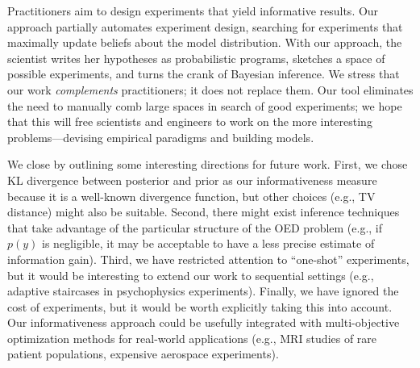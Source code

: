 \documentclass{article}
\begin{document}
Practitioners aim to design experiments that yield informative results.
Our approach partially automates experiment design, searching for experiments that maximally update beliefs about the model distribution.
With our approach, the scientist writes her hypotheses as probabilistic programs, sketches a space of possible experiments, and turns the crank of Bayesian inference.
We stress that our work \emph{complements} practitioners; it does not replace them.
Our tool eliminates the need to manually comb large spaces in search of good experiments; we hope that this will free scientists and engineers to work on the more interesting problems---devising empirical paradigms and building models.

We close by outlining some interesting directions for future work.
First, we chose KL divergence between posterior and prior as our informativeness measure because it is a well-known divergence function, but other choices (e.g., TV distance) might also be suitable.
Second, there might exist inference techniques that take advantage of the particular structure of the OED problem (e.g., if $p(y)$ is negligible, it may be acceptable to have a less precise estimate of information gain).
Third, we have restricted attention to ``one-shot'' experiments, but it would be interesting to extend our work to sequential settings (e.g., adaptive staircases in psychophysics experiments).
Finally, we have ignored the cost of experiments, but it would be worth explicitly taking this into account.
Our informativeness approach could be usefully integrated with multi-objective optimization methods for real-world applications (e.g., MRI studies of rare patient populations, expensive aerospace experiments).



\end{document}
